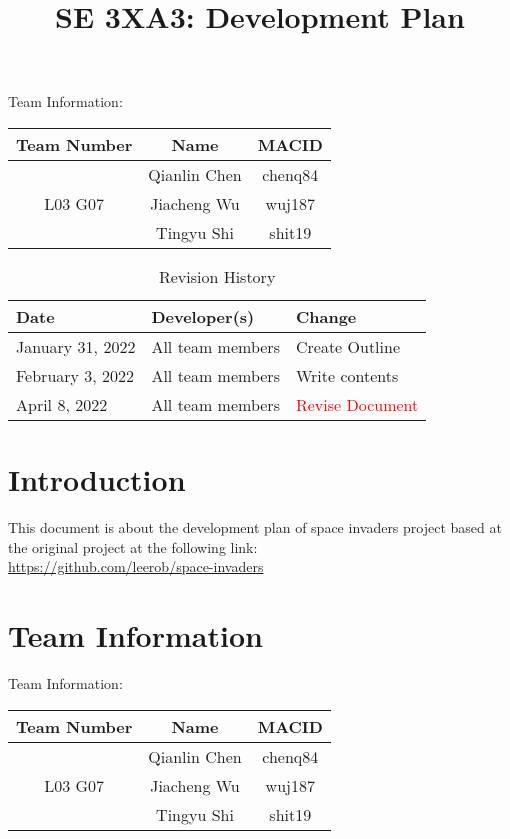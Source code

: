\documentclass[12pt]{article}
\title{SE 3XA3: Development Plan}
\begin{document}
\maketitle

{\Large Team Information:}
\begin{table}[htp]
\centering
{\Large
\begin{tabular}{|c|c|c|}
\hline
\multicolumn{1}{|l|}{Team Number} & Name         & MACID   \\ \hline
\multirow{3}{*}{L03 G07}          & Qianlin Chen & chenq84 \\ \cline{2-3} 
                                  & Jiacheng Wu  & wuj187  \\ \cline{2-3} 
                                  & Tingyu Shi   & shit19  \\ \hline
\end{tabular}
}
\end{table}

\begin{table}[htp]
\caption{Revision History} 
\begin{tabularx}{\textwidth}{llX}
\toprule
\textbf{Date} & \textbf{Developer(s)} & \textbf{Change}\\
\midrule
January 31, 2022 & All team members & Create Outline\\
February 3, 2022 & All team members & Write contents\\
April 8, 2022 & All team members & \textcolor{red}{Revise Document}\\
\bottomrule
\end{tabularx}
\end{table}

\newpage

\section{Introduction}
\noindent This document is about the
development plan of space invaders project
based at the original project at the
following link:\\
\url{https://github.com/leerob/space-invaders}
\section{Team Information}
{\Large Team Information:}
\begin{table}[htp]
\centering
{\Large
\begin{tabular}{|c|c|c|}
\hline
\multicolumn{1}{|l|}{Team Number} & Name         & MACID   \\ \hline
\multirow{3}{*}{L03 G07}          & Qianlin Chen & chenq84 \\ \cline{2-3} 
                                  & Jiacheng Wu  & wuj187  \\ \cline{2-3} 
                                  & Tingyu Shi   & shit19  \\ \hline
\end{tabular}
}
\end{table}
\end{document}
